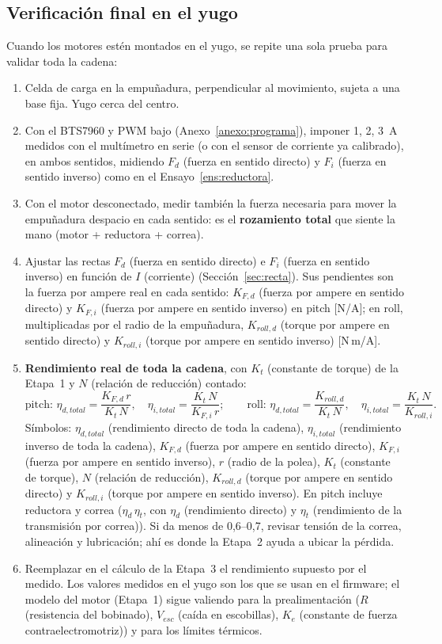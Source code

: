 \documentclass[11pt,a4paper]{article}
\begin{document}
\subsection{Verificación final en el yugo}
\label{sec:verificacion}

Cuando los motores estén montados en el yugo, se repite una sola prueba para validar toda la cadena:
\begin{enumerate}
\item Celda de carga en la empuñadura, perpendicular al movimiento, sujeta a una base fija. Yugo cerca del centro.
\item Con el BTS7960 y PWM bajo (Anexo~\ref{anexo:programa}), imponer 1, 2, 3~A medidos con el multímetro en serie (o con el sensor de corriente ya calibrado), en ambos sentidos, midiendo $F_d$ (fuerza en sentido directo) y $F_i$ (fuerza en sentido inverso) como en el Ensayo~\ref{ens:reductora}.
\item Con el motor desconectado, medir también la fuerza necesaria para mover la empuñadura despacio en cada sentido: es el \textbf{rozamiento total} que siente la mano (motor + reductora + correa).
\item Ajustar las rectas $F_d$ (fuerza en sentido directo) e $F_i$ (fuerza en sentido inverso) en función de $I$ (corriente) (Sección~\ref{sec:recta}). Sus pendientes son la fuerza por ampere real en cada sentido: $K_{F,d}$ (fuerza por ampere en sentido directo) y $K_{F,i}$ (fuerza por ampere en sentido inverso) en pitch [N/A]; en roll, multiplicadas por el radio de la empuñadura, $K_{roll,d}$ (torque por ampere en sentido directo) y $K_{roll,i}$ (torque por ampere en sentido inverso) [N\,m/A].
\item \textbf{Rendimiento real de toda la cadena}, con $K_t$ (constante de torque) de la Etapa~1 y $N$ (relación de reducción) contado:
\[
\text{pitch: } \eta_{d,total} = \frac{K_{F,d}\,r}{K_t\,N},\quad \eta_{i,total} = \frac{K_t\,N}{K_{F,i}\,r};\qquad
\text{roll: } \eta_{d,total} = \frac{K_{roll,d}}{K_t\,N},\quad \eta_{i,total} = \frac{K_t\,N}{K_{roll,i}}.
\]
Símbolos: $\eta_{d,total}$ (rendimiento directo de toda la cadena), $\eta_{i,total}$ (rendimiento inverso de toda la cadena), $K_{F,d}$ (fuerza por ampere en sentido directo), $K_{F,i}$ (fuerza por ampere en sentido inverso), $r$ (radio de la polea), $K_t$ (constante de torque), $N$ (relación de reducción), $K_{roll,d}$ (torque por ampere en sentido directo) y $K_{roll,i}$ (torque por ampere en sentido inverso). En pitch incluye reductora y correa ($\eta_d\,\eta_t$, con $\eta_d$ (rendimiento directo) y $\eta_t$ (rendimiento de la transmisión por correa)). Si da menos de 0,6--0,7, revisar tensión de la correa, alineación y lubricación; ahí es donde la Etapa~2 ayuda a ubicar la pérdida.
\item Reemplazar en el cálculo de la Etapa~3 el rendimiento supuesto por el medido. Los valores medidos en el yugo son los que se usan en el firmware; el modelo del motor (Etapa~1) sigue valiendo para la prealimentación ($R$ (resistencia del bobinado), $V_{esc}$ (caída en escobillas), $K_e$ (constante de fuerza contraelectromotriz)) y para los límites térmicos.
\end{enumerate}
\end{document}
